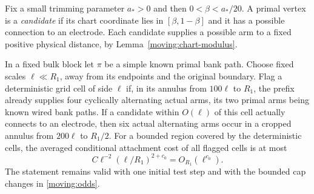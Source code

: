 Fix a small trimming parameter $a_*>0$ and then
$0<\beta<a_*/20$.  A primal vertex is a \emph{candidate} if its chart
coordinate lies in $[\beta,1-\beta]$ and it has a possible connection
to an electrode.  Each candidate supplies a possible arm to a fixed
positive physical distance, by Lemma~\ref{moving:chart-modulus}.

\begin{lemma}\label{moving:flags}
In a fixed bulk block let $\pi$ be a simple known primal bank path.
Choose fixed scales $\ell\ll R_1$, away from its endpoints and the
original boundary.  Flag a deterministic grid cell of side $\ell$
if, in its annulus from $100\ell$ to $R_1$, the prefix already supplies
four cyclically alternating actual arms, its two primal arms being
known wired bank paths.  If a candidate within $O(\ell)$ of this cell
actually connects to an electrode, then six actual alternating arms
occur in a cropped annulus from $200\ell$ to $R_1/2$.
For a bounded region covered by the deterministic cells, the averaged
conditional attachment cost of all flagged cells is at most
\begin{equation}\label{moving:flag-sum}
 C\ell^{-2}(\ell/R_1)^{2+c_0}=O_{R_1}(\ell^{c_0}).
\end{equation}
The statement remains valid with one initial test step and with the
bounded cap changes in \eqref{moving:odds}.
\end{lemma}
